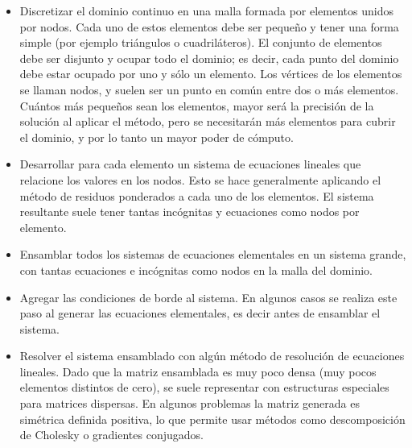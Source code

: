 \documentclass[a4paper,10pt]{article}
\begin{document}
\begin{itemize}
	\item Discretizar el dominio continuo en una malla formada por elementos unidos por nodos. Cada uno de estos elementos debe ser pequeño y tener una forma simple (por ejemplo triángulos o cuadriláteros). El conjunto de elementos debe ser disjunto y ocupar todo el dominio; es decir, cada punto del dominio debe estar ocupado por uno y sólo un elemento. Los vértices de los elementos se llaman nodos, y suelen ser un punto en común entre dos o más elementos. Cuántos más pequeños sean los elementos, mayor será la precisión de la solución al aplicar el método, pero se necesitarán más elementos para cubrir el dominio, y por lo tanto un mayor poder de cómputo. 
	
	\item Desarrollar para cada elemento un sistema de ecuaciones lineales que relacione los valores en los nodos. Esto se hace generalmente aplicando el método de residuos ponderados a cada uno de los elementos. El sistema resultante suele tener tantas incógnitas y ecuaciones como nodos por elemento.
		
	\item Ensamblar todos los sistemas de ecuaciones elementales en un sistema grande, con tantas ecuaciones e incógnitas como nodos en la malla del dominio. 
	
	\item Agregar las condiciones de borde al sistema. En algunos casos se realiza este paso al generar las ecuaciones elementales, es decir antes de ensamblar el sistema.
	
	\item Resolver el sistema ensamblado con algún método de resolución de ecuaciones lineales. Dado que la matriz ensamblada es muy poco densa (muy pocos elementos distintos de cero), se suele representar con estructuras especiales para matrices dispersas. En algunos problemas la matriz generada es simétrica definida positiva, lo que permite usar métodos como descomposición de Cholesky o gradientes conjugados.
\end{itemize}


\end{document}
